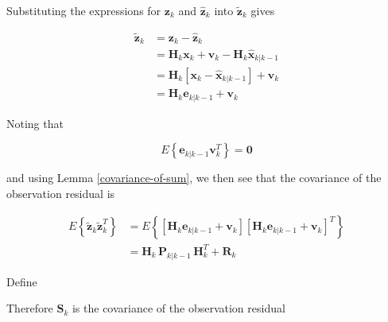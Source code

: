
Substituting the expressions for $\mathbf{z}_k$ and $\hat{\mathbf{z}}_k$ into $\tilde{\mathbf{z}}_k$ gives

\begin{equation*}
    \begin{aligned}
        \tilde{\mathbf{z}}_k &= \mathbf{z}_k - \hat{\mathbf{z}}_k \\
        &= \mathbf{H}_k \mathbf{x}_k + \mathbf{v}_k - \mathbf{H}_k \hat{\mathbf{x}}_{k|k-1} \\
        &= \mathbf{H}_k \left[ \mathbf{x}_k - \hat{\mathbf{x}}_{k|k-1} \right] + \mathbf{v}_k \\
        &= \mathbf{H}_k \mathbf{e}_{k|k-1} + \mathbf{v}_k
    \end{aligned}
\end{equation*}

Noting that

\begin{equation*}
    E \left\{ \mathbf{e}_{k|k-1} \mathbf{v}_k^T \right\} = \mathbf{0}
\end{equation*}

and using Lemma \ref{covariance-of-sum}, we then see that the covariance of the
observation residual is

\begin{equation*}
    \begin{aligned}
        E \left\{ \tilde{\mathbf{z}}_k \tilde{\mathbf{z}}_k^T \right\}
        &= E \left\{ \left[ \mathbf{H}_k \mathbf{e}_{k|k-1} + \mathbf{v}_k \right] \left[ \mathbf{H}_k \mathbf{e}_{k|k-1} + \mathbf{v}_k \right]^T \right\} \\
        &= \mathbf{H}_{k} \, \mathbf{P}_{k|k-1} \, \mathbf{H}_{k}^T + \mathbf{R}_{k}
    \end{aligned}
\end{equation*}

Define


Therefore $\mathbf{S}_k$ is the covariance of the observation residual

